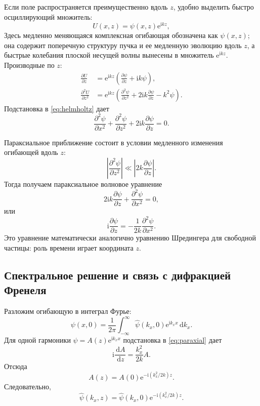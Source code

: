 \documentclass[12pt,a4paper]{article}
\newcommand{\dd}{\,\mathrm{d}}
\newcommand{\ii}{\mathrm{i}}
\newcommand{\e}{\mathrm{e}}
\begin{document}
Если поле распространяется преимущественно вдоль $z$, удобно выделить быстро осциллирующий множитель:
\begin{equation}
    U(x,z)=\psi(x,z)\e^{\ii kz},
\end{equation}
Здесь медленно меняющаяся комплексная огибающая обозначена как $\psi(x,z)$; она содержит поперечную структуру пучка и ее медленную эволюцию вдоль $z$, а быстрые колебания плоской несущей волны вынесены в множитель $\e^{\ii kz}$. Производные по $z$:
\begin{align}
    \frac{\partial U}{\partial z}
    &=\e^{\ii kz}\left(\frac{\partial\psi}{\partial z}+\ii k\psi\right),\\
    \frac{\partial^2 U}{\partial z^2}
    &=\e^{\ii kz}\left(
    \frac{\partial^2\psi}{\partial z^2}
    +2\ii k\frac{\partial\psi}{\partial z}
    -k^2\psi
    \right).
\end{align}
Подстановка в \eqref{eq:helmholtz} дает
\begin{equation}
    \frac{\partial^2\psi}{\partial x^2}
    +\frac{\partial^2\psi}{\partial z^2}
    +2\ii k\frac{\partial\psi}{\partial z}=0.
\end{equation}

Параксиальное приближение состоит в условии медленного изменения огибающей вдоль $z$:
\begin{equation}
    \left|\frac{\partial^2\psi}{\partial z^2}\right|
    \ll
    \left|2k\frac{\partial\psi}{\partial z}\right|.
\end{equation}
Тогда получаем параксиальное волновое уравнение
\begin{equation}
    2\ii k\frac{\partial\psi}{\partial z}
    +\frac{\partial^2\psi}{\partial x^2}=0,
\end{equation}
или
\begin{equation}
    \ii\frac{\partial\psi}{\partial z}
    =
    -\frac{1}{2k}\frac{\partial^2\psi}{\partial x^2}.
    \label{eq:paraxial}
\end{equation}
Это уравнение математически аналогично уравнению Шредингера для свободной частицы: роль времени играет координата $z$.

\subsection{Спектральное решение и связь с дифракцией Френеля}

Разложим огибающую в интеграл Фурье:
\begin{equation}
    \psi(x,0)=\frac{1}{2\pi}\int_{-\infty}^{\infty}
    \widehat{\psi}(k_x,0)\e^{\ii k_xx}\dd k_x.
\end{equation}
Для одной гармоники $\psi=A(z)\e^{\ii k_xx}$ подстановка в \eqref{eq:paraxial} дает
\begin{equation}
    \ii\frac{\dd A}{\dd z}=\frac{k_x^2}{2k}A.
\end{equation}
Отсюда
\begin{equation}
    A(z)=A(0)\e^{-\ii(k_x^2/2k)z}.
\end{equation}
Следовательно,
\begin{equation}
    \widehat{\psi}(k_x,z)=
    \widehat{\psi}(k_x,0)
    \e^{-\ii(k_x^2/2k)z}.
    \label{eq:paraxial_propagator}
\end{equation}
\end{document}
